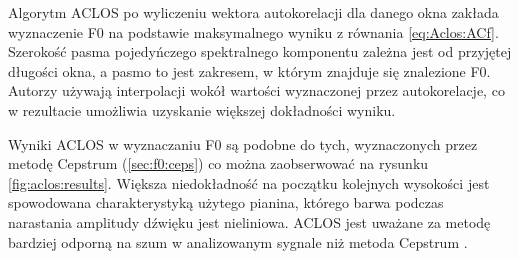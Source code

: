 \documentclass[12pt,a4paper,twoside]{mwart}
\begin{document}
Algorytm ACLOS po wyliczeniu wektora autokorelacji dla danego okna zakłada wyznaczenie F0 na podstawie maksymalnego wyniku z równania \ref{eq:Aclos:ACf}. Szerokość pasma pojedyńczego spektralnego komponentu zależna jest od przyjętej długości okna, a pasmo to jest zakresem, w którym znajduje się znalezione F0. Autorzy używają interpolacji wokół wartości wyznaczonej przez autokorelacje, co w rezultacie umożliwia uzyskanie większej dokładności wyniku.

Wyniki ACLOS w wyznaczaniu F0 są podobne do tych, wyznaczonych przez metodę Cepstrum (\ref{sec:f0:ceps}) co można zaobserwować na rysunku \ref{fig:aclos:results}. Większa niedokładność na początku kolejnych wysokości jest spowodowana charakterystyką użytego pianina, którego barwa podczas narastania amplitudy dźwięku jest nieliniowa. ACLOS jest uważane za metodę bardziej odporną na szum w analizowanym sygnale niż metoda Cepstrum \cite{Transcription:Kunieda:Aclos}.
\end{document}
